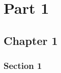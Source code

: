 \documentclass{book}
\begin{document}
\part{Part 1}
\label{part:part-1}


\chapter{Chapter 1}
\label{cha:chapter-1}


\section{Section 1}
\label{sec:section-1}
\end{document}
